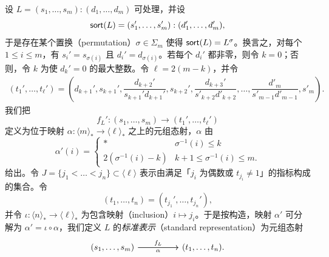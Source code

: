\begin{construction}\label{tuplemorphismfromlayout}
设 $L = (s_1,\dots,s_m):(d_1,\dots,d_m)$ 可处理，并设
\[
\mathsf{sort}(L) = (s_1',\dots,s_m'):(d_1',\dots,d_m'),
\]
于是存在某个置换（permutation）$\sigma \in \Sigma_m$ 使得 $\mathsf{sort}(L) = L^\sigma$。换言之，对每个 $1 \leq i \leq m$，有 $s_i' = s_{\sigma(i)}$ 且 $d_i' = d_{\sigma(i)}$。若每个 $d_i'$ 都非零，则令 $k = 0$；否则，令 $k$ 为使 $d_k' = 0$ 的最大整数。令 $\ell = 2(m-k)$，并令
\begin{align*}
 (t_1',\dots,t_{\ell}') = \left(d_{k+1}',s_{k+1}', \dfrac{d_{k+2}'}{s_{k+1}'d_{k+1}'} , s_{k+2}' , \dfrac{d_{k+3}'}{s'_{k+2}d'_{k+2}}, \dots,\dfrac{d'_m}{s'_{m-1}d'_{m-1}}, s'_m \right).
\end{align*}
我们把
\[f_L':(s_1,\dots,s_m) \to (t_1',\dots,t_\ell')\]
定义为位于映射 $\alpha : \langle m \rangle_* \to \langle \ell \rangle_*$ 之上的元组态射，$\alpha$ 由
\[
\alpha'(i) = \begin{cases}
    * & \sigma^{-1}(i) \leq k\\
    2(\sigma^{-1}(i)-k) & k+1 \leq \sigma^{-1}(i) \leq m.
\end{cases}
\]
给出。令 $J = \{j_1 < \dots < j_n\} \subset \langle \ell \rangle$ 表示由满足「$j_i$ 为偶数或 $t_{j_i} \neq 1$」的指标构成的集合。令
\[
(t_1,\dots,t_n) = (t_{j_1}',\dots,t_{j_n}'),
\]
并令 $\iota:\langle n \rangle_* \to \langle \ell \rangle_*$ 为包含映射（inclusion）$i \mapsto j_i$。于是按构造，映射 $\alpha'$ 可分解为 $\alpha' = \iota \circ \alpha$，我们定义 $L$ 的{\it 标准表示}（standard representation）为元组态射
\[
\begin{tikzcd}
    (s_1,\dots,s_m) \ar[rr,"f_L"] \ar[rr,swap,"\alpha"] & & (t_1,\dots,t_n). \\
\end{tikzcd}
\]
\end{construction}

